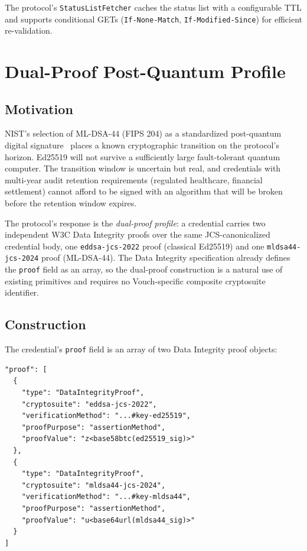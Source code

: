 \documentclass[11pt,a4paper]{article}
\begin{document}
The protocol's \verb|StatusListFetcher| caches the status list with a configurable TTL and supports conditional GETs (\verb|If-None-Match|, \verb|If-Modified-Since|) for efficient re-validation.

\section{Dual-Proof Post-Quantum Profile}
\label{sec:hybrid}

\subsection{Motivation}

NIST's selection of ML-DSA-44 (FIPS 204) as a standardized post-quantum digital signature~\cite{nistfips204} places a known cryptographic transition on the protocol's horizon. Ed25519 will not survive a sufficiently large fault-tolerant quantum computer. The transition window is uncertain but real, and credentials with multi-year audit retention requirements (regulated healthcare, financial settlement) cannot afford to be signed with an algorithm that will be broken before the retention window expires.

The protocol's response is the \emph{dual-proof profile}: a credential carries two independent W3C Data Integrity proofs over the same JCS-canonicalized credential body, one \texttt{eddsa-jcs-2022} proof (classical Ed25519) and one \texttt{mldsa44-jcs-2024} proof (ML-DSA-44). The Data Integrity specification already defines the \verb|proof| field as an array, so the dual-proof construction is a natural use of existing primitives and requires no Vouch-specific composite cryptosuite identifier.

\subsection{Construction}

The credential's \verb|proof| field is an array of two Data Integrity proof objects:

\begin{verbatim}
"proof": [
  {
    "type": "DataIntegrityProof",
    "cryptosuite": "eddsa-jcs-2022",
    "verificationMethod": "...#key-ed25519",
    "proofPurpose": "assertionMethod",
    "proofValue": "z<base58btc(ed25519_sig)>"
  },
  {
    "type": "DataIntegrityProof",
    "cryptosuite": "mldsa44-jcs-2024",
    "verificationMethod": "...#key-mldsa44",
    "proofPurpose": "assertionMethod",
    "proofValue": "u<base64url(mldsa44_sig)>"
  }
]
\end{verbatim}
\end{document}

